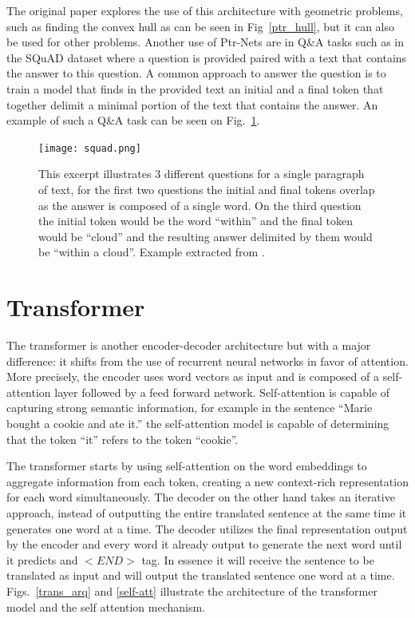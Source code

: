The original paper explores the use of this architecture with geometric problems, such as finding the convex hull as can be seen in Fig~\ref{ptr_hull}, but it can also be used for other problems. Another use of Ptr-Nets are in Q\&A tasks such as in the SQuAD dataset \citep{squad1} where a question is provided paired with a text that contains the answer to this question. A common approach \citep{squad_pointer} to answer the question is to train a model that finds in the provided text an initial and a final token that together delimit a minimal portion of the text that contains the answer. An example of such a Q\&A task can be seen on Fig.~\ref{squad}.

  
\begin{figure}[!ht]
\centering
\texttt{[image: squad.png]}
\caption{This excerpt illustrates 3 different questions for a single paragraph of text, for the first two questions the initial and final tokens overlap as the answer is composed of a single word. On the third question the initial token would be the word ``within'' and the final token would be ``cloud'' and the resulting answer delimited by them would be ``within a cloud''. Example extracted from \citep{squad1}.}
\label{squad}
\end{figure}




\section{Transformer}
The transformer \citep{attention_is_all_you_need} is another encoder-decoder architecture but with a major difference: it shifts from the use of recurrent neural networks in favor of attention. More precisely, the encoder uses word vectors as input and is composed of a self-attention layer followed by a feed forward network.
Self-attention is capable of capturing strong semantic information, for example in the sentence ``Marie bought a cookie and ate it.'' the self-attention model is capable of determining that the token ``it'' refers to the token ``cookie''.


The transformer starts by using self-attention on the word embeddings to aggregate information from each token, creating a new context-rich representation for each word simultaneously. The decoder on the other hand takes an iterative approach, instead of outputting the entire translated sentence at the same time it generates one word at a time. The decoder utilizes the final representation output by the encoder and every word it already output to generate the next word until it predicts and $<END>$ tag. In essence it will receive the sentence to be translated as input and will output the translated sentence one word at a time. Figs.~\ref{trans_arq} and \ref{self-att} illustrate the architecture of the transformer model and the self attention mechanism.

